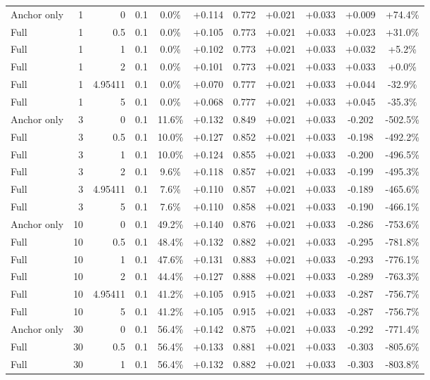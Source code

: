 \begin{table}[htbp]
\begin{tabular}{lrrrccccccc}
Anchor only & 1 & 0 & 0.1 & 0.0\% & +0.114 & 0.772 & +0.021 & +0.033 & +0.009 & +74.4\% \\
Full & 1 & 0.5 & 0.1 & 0.0\% & +0.105 & 0.773 & +0.021 & +0.033 & +0.023 & +31.0\% \\
Full & 1 & 1 & 0.1 & 0.0\% & +0.102 & 0.773 & +0.021 & +0.033 & +0.032 & +5.2\% \\
Full & 1 & 2 & 0.1 & 0.0\% & +0.101 & 0.773 & +0.021 & +0.033 & +0.033 & +0.0\% \\
Full & 1 & 4.95411 & 0.1 & 0.0\% & +0.070 & 0.777 & +0.021 & +0.033 & +0.044 & -32.9\% \\
Full & 1 & 5 & 0.1 & 0.0\% & +0.068 & 0.777 & +0.021 & +0.033 & +0.045 & -35.3\% \\
Anchor only & 3 & 0 & 0.1 & 11.6\% & +0.132 & 0.849 & +0.021 & +0.033 & -0.202 & -502.5\% \\
Full & 3 & 0.5 & 0.1 & 10.0\% & +0.127 & 0.852 & +0.021 & +0.033 & -0.198 & -492.2\% \\
Full & 3 & 1 & 0.1 & 10.0\% & +0.124 & 0.855 & +0.021 & +0.033 & -0.200 & -496.5\% \\
Full & 3 & 2 & 0.1 & 9.6\% & +0.118 & 0.857 & +0.021 & +0.033 & -0.199 & -495.3\% \\
Full & 3 & 4.95411 & 0.1 & 7.6\% & +0.110 & 0.857 & +0.021 & +0.033 & -0.189 & -465.6\% \\
Full & 3 & 5 & 0.1 & 7.6\% & +0.110 & 0.858 & +0.021 & +0.033 & -0.190 & -466.1\% \\
Anchor only & 10 & 0 & 0.1 & 49.2\% & +0.140 & 0.876 & +0.021 & +0.033 & -0.286 & -753.6\% \\
Full & 10 & 0.5 & 0.1 & 48.4\% & +0.132 & 0.882 & +0.021 & +0.033 & -0.295 & -781.8\% \\
Full & 10 & 1 & 0.1 & 47.6\% & +0.131 & 0.883 & +0.021 & +0.033 & -0.293 & -776.1\% \\
Full & 10 & 2 & 0.1 & 44.4\% & +0.127 & 0.888 & +0.021 & +0.033 & -0.289 & -763.3\% \\
Full & 10 & 4.95411 & 0.1 & 41.2\% & +0.105 & 0.915 & +0.021 & +0.033 & -0.287 & -756.7\% \\
Full & 10 & 5 & 0.1 & 41.2\% & +0.105 & 0.915 & +0.021 & +0.033 & -0.287 & -756.7\% \\
Anchor only & 30 & 0 & 0.1 & 56.4\% & +0.142 & 0.875 & +0.021 & +0.033 & -0.292 & -771.4\% \\
Full & 30 & 0.5 & 0.1 & 56.4\% & +0.133 & 0.881 & +0.021 & +0.033 & -0.303 & -805.6\% \\
Full & 30 & 1 & 0.1 & 56.4\% & +0.132 & 0.882 & +0.021 & +0.033 & -0.303 & -803.8\% \\

\end{tabular}
\end{table}
